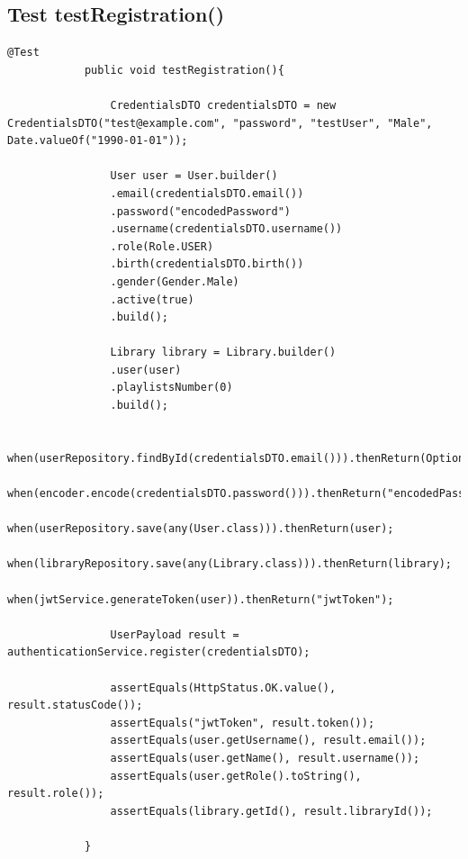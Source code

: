 \documentclass{article}
\begin{document}
		\subsection{Test testRegistration()}
		\begin{lstlisting}[style=JavaStyle, label={lst:java_code}]
			@Test
			public void testRegistration(){
				
				CredentialsDTO credentialsDTO = new CredentialsDTO("test@example.com", "password", "testUser", "Male", Date.valueOf("1990-01-01"));
				
				User user = User.builder()
				.email(credentialsDTO.email())
				.password("encodedPassword")
				.username(credentialsDTO.username())
				.role(Role.USER)
				.birth(credentialsDTO.birth())
				.gender(Gender.Male)
				.active(true)
				.build();
				
				Library library = Library.builder()
				.user(user)
				.playlistsNumber(0)
				.build();
				
				when(userRepository.findById(credentialsDTO.email())).thenReturn(Optional.empty());
				when(encoder.encode(credentialsDTO.password())).thenReturn("encodedPassword");
				when(userRepository.save(any(User.class))).thenReturn(user);
				when(libraryRepository.save(any(Library.class))).thenReturn(library);
				when(jwtService.generateToken(user)).thenReturn("jwtToken");
				
				UserPayload result = authenticationService.register(credentialsDTO);
				
				assertEquals(HttpStatus.OK.value(), result.statusCode());
				assertEquals("jwtToken", result.token());
				assertEquals(user.getUsername(), result.email());
				assertEquals(user.getName(), result.username());
				assertEquals(user.getRole().toString(), result.role());
				assertEquals(library.getId(), result.libraryId());
				
			}
		\end{lstlisting}
		\newpage
		
\end{document}
